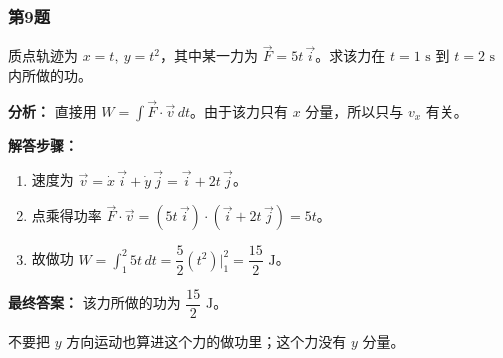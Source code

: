 \documentclass[12pt,a4paper]{ctexart}
\begin{document}
\subsubsection*{第9题}
\begin{tcolorbox}[colback=gray!2!white,colframe=black!60,title={题目}]
质点轨迹为 \(x=t,\ y=t^2\)，其中某一力为 \(\vec F=5t\,\vec i\)。求该力在 \(t=1\text{ s}\) 到 \(t=2\text{ s}\) 内所做的功。\par
\end{tcolorbox}
\begin{tcolorbox}[colback=blue!2!white,colframe=blue!55!black,title={完整答案}]
\textbf{分析：}
直接用 \(W=\int \vec F\cdot \vec v\,dt\)。由于该力只有 \(x\) 分量，所以只与 \(v_x\) 有关。\par
\textbf{解答步骤：}
\begin{enumerate}
\item 速度为 \(\vec v=\dot x\,\vec i+\dot y\,\vec j=\vec i+2t\,\vec j\)。
\item 点乘得功率 \(\vec F\cdot \vec v=(5t\,\vec i)\cdot(\vec i+2t\,\vec j)=5t\)。
\item 故做功 \(W=\int_1^2 5t\,dt=\dfrac52(t^2)\big|_1^2=\dfrac{15}{2}\text{ J}\)。
\end{enumerate}
\textbf{最终答案：}
该力所做的功为 \(\dfrac{15}{2}\text{ J}\)。\par
\end{tcolorbox}
\begin{tcolorbox}[colback=red!2!white,colframe=red!55!black,title={易错点}]
不要把 \(y\) 方向运动也算进这个力的做功里；这个力没有 \(y\) 分量。\par
\end{tcolorbox}
\end{document}
